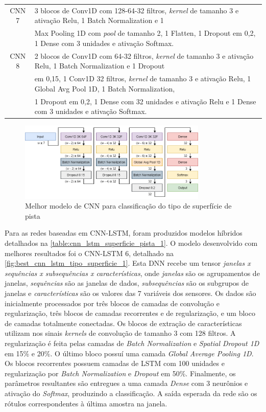 \begin{center}
\begin{longtable}{cl}
CNN 7 &  3 blocos de Conv1D com 128-64-32 filtros, \textit{kernel} de tamanho 3 e ativação Relu, 1 Batch Normalization e 1 \\ & Max Pooling 1D com \textit{pool} de tamanho 2, 1 Flatten, 1 Dropout em 0,2, 1 Dense com 3 unidades e ativação Softmax. \\ \midrule
CNN 8 & 2 blocos de Conv1D com 64-32 filtros, \textit{kernel} de tamanho 3 e ativação Relu, 1 Batch Normalization e 1 Dropout \\ & em 0,15, 1 Conv1D 32 filtros, \textit{kernel} de tamanho 3 e ativação Relu, 1 Global Avg Pool 1D, 1 Batch Normalization, \\ & 1 Dropout em 0,2, 1 Dense com 32 unidades e ativação Relu e 1 Dense com 3 unidades e ativação Softmax. \\ \bottomrule
\end{longtable}
\end{center}

\begin{figure}[H]
  \centering
  \caption{Melhor modelo de CNN para classificação do tipo de superfície de pista}
  \label{fig:best_cnn_dnn_tipo_superficie_1}
  \includegraphics[width=0.8\textwidth]{figuras/fig_32.png}
\end{figure}

Para as redes baseadas em CNN-LSTM, foram produzidos modelos híbridos detalhados na \autoref{table:cnn_lstm_superficie_pista_1}. O modelo desenvolvido com melhores resultados foi o CNN-LSTM 6, detalhado na \autoref{fig:best_cnn_lstm_tipo_superficie_1}. Esta DNN recebe um tensor \emph{janelas x sequências x subsequências x características}, onde \emph{janelas} são os agrupamentos de janelas, \emph{sequências} são as janelas de dados, \emph{subsequências} são os subgrupos de janelas e \emph{características} são os valores das 7 variáveis dos sensores. Os dados são inicialmente processados por três blocos de camadas de convolução e regularização, três blocos de camadas recorrentes e de regularização, e um bloco de camadas totalmente conectadas. Os blocos de extração de características utilizam nos sinais \textit{kernels} de convolução de tamanho 3 com 128 filtros. A regularização é feita pelas camadas de \textit{Batch Normalization} e \textit{Spatial Dropout 1D} em 15\% e 20\%. O último bloco possuí uma camada \textit{Global Average Pooling 1D}. Os blocos recorrentes possuem camadas de LSTM com 100 unidades e regularização por \textit{Batch Normalization} e \textit{Dropout} em 50\%. Finalmente, os parâmetros resultantes são entregues a uma camada \textit{Dense} com 3 neurônios e ativação do \textit{Softmax}, produzindo a classificação. A saída esperada da rede são os rótulos correspondentes à última amostra na janela.

